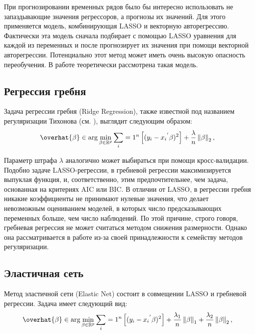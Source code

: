 При прогнозировании временных рядов было бы интересно использовать не запаздывающие значения регрессоров, а прогнозы их значений. Для этого применяется модель, комбинирующая LASSO и векторную авторегрессию. Фактически эта модель сначала подбирает с помощью LASSO уравнения для каждой из переменных и после прогнозирует их значения при помощи векторной авторегрессии. Потенциально этот метод может иметь очень высокую опасность переобучения. В работе \cite{gredenhoff1999lag} теоретически рассмотрена такая модель.

\subsection{Регрессия гребня}
Задача регрессии гребня (Ridge Regression), также известной под названием регуляризации Тихонова (см. \cite{тихонов1963решении}), выглядит следующим образом:
\begin{equation}
\overhat{\beta} \in \arg \min_{\beta \in
\mathbb{R}^p} \sum_i=1^n \left[ (y_i - {x_i}^{'} \beta)^2 \right] +  \frac{\lambda}{n} \left\lVert \beta \right\rVert_2,
\end{equation}

Параметр штрафа $\lambda$ аналогично может выбираться при помощи кросс-валидации.
Подобно задаче LASSO-регрессии, в гребневой регрессии максимизируется выпуклая функция, и, соответственно, этим предпочтительнее, чем задача, основанная на критериях AIC или BIC.
В отличии от LASSO, в регрессии гребня никакие коэффициенты не принимают нулевые значения, что делает невозможным оцениванием моделей, в которых число предсказывающих переменных больше, чем число наблюдений.  По этой причине, строго говоря, гребневая регрессия не может считаться методом снижения размерности. Однако она рассматривается в работе из-за своей принадлежности к семейству методов регуляризации.

\subsection{Эластичная сеть}
Метод эластичной сети (Elastic Net) состоит в совмещении LASSO и гребневой регрессии. Задача имеет следующий вид:
\begin{equation}
\overhat{\beta} \in \arg \min_{\beta \in
\mathbb{R}^p} \sum_i=1^n \left[ (y_i - {x_i}^{'} \beta)^2 \right] +  \frac{\lambda_1}{n} \left\lVert \beta \right\rVert_1 + \frac{\lambda_2}{n} \left\lVert \beta \right\rVert_2,
\end{equation}

